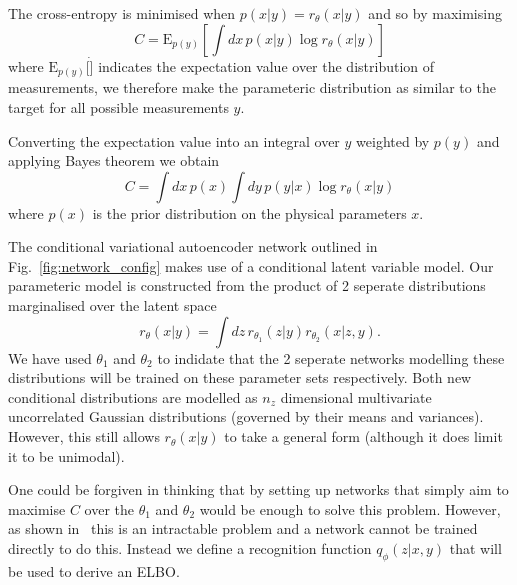 \documentclass[%
showpacs,
 amsmath,amssymb,
 aps,
 twocolumn,
 prl,
 reprint,
floatfix,
]{revtex4-1}
\begin{document}
The cross-entropy is minimised when $p(x|y)=r_{\theta}(x|y)$ and so by maximising
%
\begin{equation}\label{eq:cost1}
C = \text{E}_{p(y)}\left[\int dx\,p(x|y) \log r_{\theta}(x|y)\right]
\end{equation}
% 
where $\text{E}_{p(y)}[\dot]$ indicates the expectation value over the
distribution of measurements, we therefore make the parameteric distribution as
similar to the target for all possible measurements $y$.

Converting the expectation value into an integral over $y$ weighted by $p(y)$
and applying Bayes theorem we obtain
%
\begin{equation}\label{eq:cost1}
C = \int dx\,p(x)\int dy\,p(y|x)\log r_{\theta}(x|y)
\end{equation}
%
where $p(x)$ is the prior distribution on the physical parameters $x$.

The conditional variational autoencoder network outlined in
Fig.~\ref{fig:network_config} makes use of a conditional latent variable model.
Our parameteric model is constructed from the product of 2 seperate
distributions marginalised over the latent space
%
\begin{equation}\label{eq:latent_model}
r_{\theta}(x|y) = \int dz\,r_{\theta_{1}}(z|y)r_{\theta_{2}}(x|z,y).
\end{equation}
%  
We have used $\theta_{1}$ and $\theta_{2}$ to indidate that the 2 seperate
networks modelling these distributions will be trained on these parameter sets
respectively. Both new conditional distributions are modelled as $n_{z}$
dimensional multivariate uncorrelated Gaussian distributions (governed by their
means and variances). However, this still allows $r_{\theta}(x|y)$ to take a
general form (although it does limit it to be unimodal).  

One could be forgiven in thinking that by setting up networks that simply aim
to maximise $C$ over the $\theta_{1}$ and $\theta_{2}$ would be enough to solve
this problem. However, as shown in~\cite{NIPS2015_5775} this is an intractable
problem and a network cannot be trained directly to do this. Instead we define
a recognition function $q_{\phi}(z|x,y)$ that will be used to derive an
\ac{ELBO}.
\end{document}
